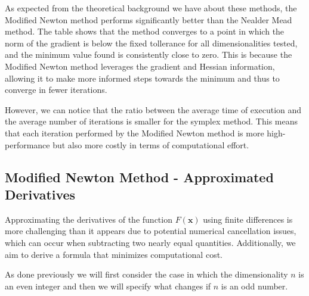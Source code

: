 As expected from the theoretical background we have about these methods, the Modified Newton method performs significantly better than the Nealder Mead method. The table shows that the method converges to a point in which the norm of the gradient is below the fixed tollerance for all dimensionalities tested, and the minimum value found is consistently close to zero. 
This is because the Modified Newton method leverages the gradient and Hessian information, allowing it to make more informed steps towards the minimum and thus to converge in fewer iterations.

However, we can notice that the ratio between the average time of execution and the average number of iterations is smaller for the symplex method. This means that each iteration performed by the Modified Newton method is more high-performance but also more costly in terms of computational effort. 

\medskip
\subsection*{Modified Newton Method - Approximated Derivatives}
Approximating the derivatives of the function $F(\mathbf{x})$ using finite differences is more challenging than it appears due to potential numerical cancellation issues, which can occur when subtracting two nearly equal quantities. Additionally, we aim to derive a formula that minimizes computational cost.

As done previously we will first consider the case in which the dimensionality $n$ is an even integer and then we will specify what changes if $n$ is an odd number.

